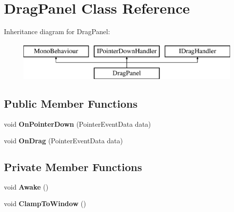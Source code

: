 \hypertarget{class_drag_panel}{}\section{Drag\+Panel Class Reference}
\label{class_drag_panel}
Inheritance diagram for Drag\+Panel\+:\begin{figure}[H]
\begin{center}
\leavevmode
\includegraphics[height=2.000000cm]{class_drag_panel}
\end{center}
\end{figure}
\subsection*{Public Member Functions}
\begin{DoxyCompactItemize}
\item 
\mbox{\label{class_drag_panel_ac7db064b70f1fc9ffdf9d2df548c7745}} 
void {\bfseries On\+Pointer\+Down} (Pointer\+Event\+Data data)
\item 
\mbox{\label{class_drag_panel_a6fad463442df4614255f003d1ce49a49}} 
void {\bfseries On\+Drag} (Pointer\+Event\+Data data)
\end{DoxyCompactItemize}
\subsection*{Private Member Functions}
\begin{DoxyCompactItemize}
\item 
\mbox{\label{class_drag_panel_a4824c6b9d6beda48f2c22d124b7ebf79}} 
void {\bfseries Awake} ()
\item 
\mbox{\label{class_drag_panel_ad76a3b6fd9d0a06dba9a4383536fdca3}} 
void {\bfseries Clamp\+To\+Window} ()
\end{DoxyCompactItemize}
